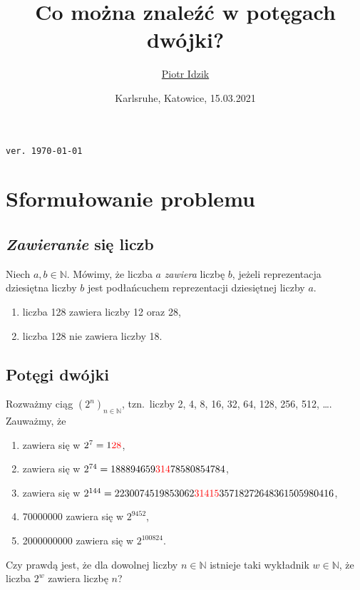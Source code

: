 \documentclass[aspectratio=169]{beamer}
\author{\texorpdfstring{\href{https://www.linkedin.com/in/piotr-idzik-34b572151/}{Piotr Idzik} \\ \email{vil02@o2.pl}}{Piotr Idzik}}
\title{Co można znaleźć w potęgach dwójki?}
\date{Karlsruhe, Katowice, 15.03.2021}
\newcommand{\enumsymbol}{$\triangleright$}
\newcommand{\colora}[1]{{\color{red}{#1}}}
\newcommand{\N}{\mathbb{N}}
\newcommand{\define}[1]{\textit{#1}}
\begin{document}
\begin{frame}[plain]
\maketitle

\href{https://www.linkedin.com/in/piotr-idzik-34b572151/}{\faLinkedinSquare}
\href{https://github.com/vil02}{\faGithubSquare}
\hfill \textcolor[rgb]{0.85,0.85,0.85}{\texttt{\tiny{ver. \today\ \currenttime\/}}}
\end{frame}
\section{Sformułowanie problemu}
\subsection{\define{Zawieranie} się liczb}
\begin{frame}
  \begin{definition}
    Niech $a, b \in \N$.
    Mówimy, że liczba $a$ \define{zawiera} liczbę $b$,
    jeżeli reprezentacja dziesiętna liczby $b$ jest podłańcuchem reprezentacji dziesiętnej liczby $a$.
  \end{definition}

  \begin{example}
    \begin{enumerate}[label=\enumsymbol]
      \item liczba 128 zawiera liczby 12 oraz 28,
      \item liczba 128 nie zawiera liczby 18.
    \end{enumerate}
  \end{example}
\end{frame}
\subsection{Potęgi dwójki}
\begin{frame}
  Rozważmy ciąg ${(2^n)}_{n \in \N}$, tzn.\ liczby 2, 4, 8, 16, 32, 64, 128, 256, 512, \ldots{}.
  Zauważmy, że
  \begin{enumerate}[label=\enumsymbol]
    \item \colora{28} zawiera się w $2^7 = 1\colora{28}$,
    \item \colora{314} zawiera się w $2^{74} = 188894659\colora{314}78580854784$,
    \item \colora{31415} zawiera się w $2^{144} = 2230074519853062\colora{31415}35718272648361505980416$,
    \item 70000000 zawiera się w $2^{9452}$,
    \item 2000000000 zawiera się w $2^{100824}$.
  \end{enumerate}
  Czy prawdą jest, że dla dowolnej liczby $n \in \N$ istnieje taki wykładnik $w \in \N$, że liczba $2^w$ zawiera liczbę $n$?
\end{frame}
\end{document}
